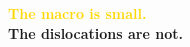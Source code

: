 \documentclass[aspectratio=169,11pt]{beamer}
\begin{document}
{
\begin{frame}[plain]
\vfill
\begin{center}
{\huge\bfseries\textcolor{Gold}{The macro is small.}}\\[0.6cm]
{\huge\bfseries\textcolor{SoftWhite}{The dislocations are \alert{not}.}}
\end{center}
\vfill
\end{frame}}
\end{document}
